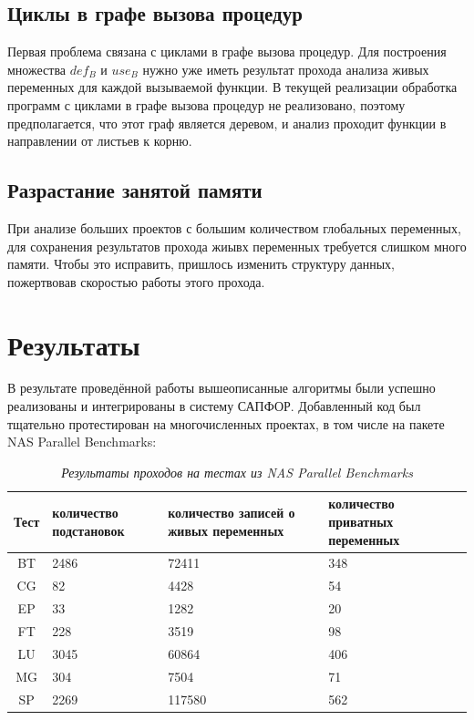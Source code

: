 \documentclass{article}
\begin{document}
\subsection*{Циклы в графе вызова процедур}
    Первая проблема связана с циклами в графе вызова процедур. Для построения множества $def_B$ и $use_B$ нужно уже иметь результат прохода анализа живых переменных для каждой вызываемой функции. В текущей реализации обработка программ с циклами в графе вызова процедур не реализовано, 
    поэтому предполагается, что этот граф является деревом, и анализ проходит функции в направлении от листьев к корню.

\subsection*{Разрастание занятой памяти}
    При анализе больших проектов с большим количеством глобальных переменных, для сохранения результатов прохода жиывх переменных требуется слишком много памяти. Чтобы это исправить, пришлось изменить структуру данных, пожертвовав скоростью работы этого прохода.

\section{Результаты}
    В результате проведённой работы вышеописанные алгоритмы были успешно реализованы и интегрированы в систему САПФОР.
    Добавленный код был тщательно протестирован на многочисленных проектах, в том числе на пакете NAS Parallel Benchmarks\cite{npb}:
\\

\begin{table}[h!]
    \centering
\begin{tabular}{ | c || p{2.5cm} | p{3.5cm} | p{2.5cm} |  }
 \hline
 Тест& количество подстановок & количество записей о живых переменных &количество приватных переменных\\
 \hline
 BT & 2486 & 72411 & 348 \\
 \hline
CG & 82 & 4428 & 54 \\
\hline
EP & 33 & 1282 & 20 \\
\hline
FT & 228 & 3519 & 98 \\
\hline
LU & 3045 & 60864 & 406 \\
\hline
MG & 304 & 7504 & 71 \\
\hline
SP & 2269 & 117580 & 562 \\
 \hline
\end{tabular}
\caption*{\textit{Результаты проходов на тестах из NAS Parallel Benchmarks}}
\end{table}


\printbibliography %
\end{document}
